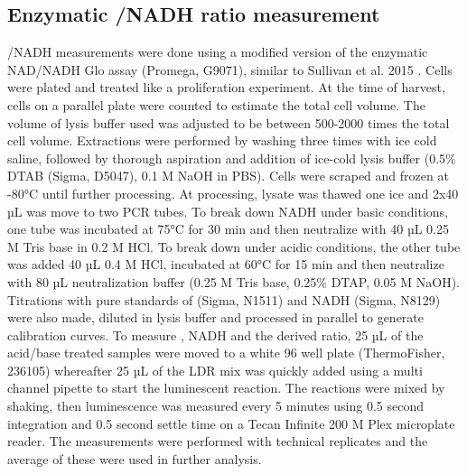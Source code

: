 \subsection{Enzymatic \NAD{}/NADH ratio measurement}
\NAD{}/NADH measurements were done using a modified version of the enzymatic NAD/NADH Glo assay (Promega, G9071), similar to Sullivan et al. 2015 \cite{Sullivan2015-xf}.
Cells were plated and treated like a proliferation experiment.
At the time of harvest, cells on a parallel plate were counted to estimate the total cell volume.
The volume of lysis buffer used was adjusted to be between 500-2000 times the total cell volume.
Extractions were performed by washing three times with ice cold saline, followed by thorough aspiration and addition of ice-cold lysis buffer (0.5\% DTAB (Sigma, D5047), 0.1 M NaOH in PBS).
Cells were scraped and frozen at -80°C until further processing.
At processing, lysate was thawed one ice and 2x40 µL was move to two PCR tubes.
To break down NADH under basic conditions, one tube was incubated at 75°C for 30 min and then neutralize with 40 µL 0.25 M Tris base in 0.2 M HCl.
To break down \NAD{} under acidic conditions, the other tube was added 40 µL 0.4 M HCl, incubated at 60°C for 15 min and then neutralize with 80 µL neutralization buffer (0.25 M Tris base, 0.25\% DTAP, 0.05 M NaOH).
Titrations with pure standards of \NAD{} (Sigma, N1511) and NADH (Sigma, N8129) were also made, diluted in lysis buffer and processed in parallel to generate calibration curves.
To measure \NAD{}, NADH and the derived ratio, 25 µL of the acid/base treated samples were moved to a white 96 well plate (ThermoFisher, 236105) whereafter 25 µL of the LDR mix was quickly added using a multi channel pipette to start the luminescent reaction.
The reactions were mixed by shaking, then luminescence was measured every 5 minutes using 0.5 second integration and 0.5 second settle time on a Tecan Infinite 200 M Plex microplate reader.
The measurements were performed with technical replicates and the average of these were used in further analysis.


